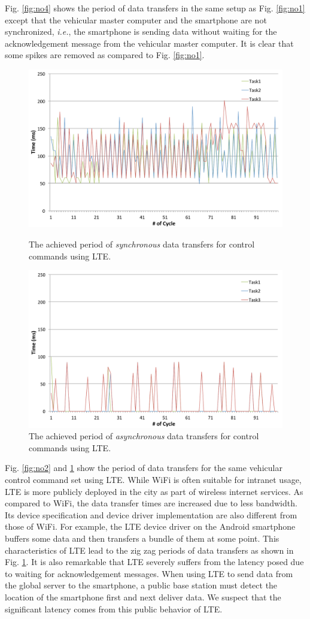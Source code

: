 Fig. \ref{fig:no4} shows the period of data transfers in the same
setup as Fig. \ref{fig:no1} except that the vehicular master computer and
the smartphone are not synchronized, \textit{i.e.}, the smartphone is
sending data without waiting for the acknowledgement message from the
vehicular master computer.
It is clear that some spikes are removed as compared to
Fig. \ref{fig:no1}.

\begin{figure}[!t]
 \centering
 \includegraphics[width=0.8\hsize]{fig/No2_Andrive_serv_cycle_LTE.pdf}
 \caption{The achieved period of \textit{synchronous} data transfers for
 control commands using LTE.}
 \label{fig:no2}
 \vspace{1em}
 \includegraphics[width=0.8\hsize]{fig/No5_Andrive_serv_cycle_LTE_only_send.pdf}
 \caption{The achieved period of \textit{asynchronous} data transfers for
 control commands using LTE.}
 \label{fig:no5}
\end{figure}

Fig. \ref{fig:no2} and \ref{fig:no5} show the period of data transfers
for the same vehicular control command set using LTE.
While WiFi is often suitable for intranet usage, LTE is more publicly
deployed in the city as part of wireless internet services.
As compared to WiFi, the data transfer times are increased due to less
bandwidth.
Its device specification and device driver implementation are also
different from those of WiFi.
For example, the LTE device driver on the Android smartphone buffers
some data and then transfers a bundle of them at some point.
This characteristics of LTE lead to the zig zag periods of data
transfers as shown in Fig. \ref{fig:no5}.
It is also remarkable that LTE severely suffers from the latency posed
due to waiting for acknowledgement messages.
When using LTE to send data from the global server to the smartphone, a
public base station must detect the location of the smartphone first and
next deliver data.
We suspect that the significant latency comes from this public behavior
of LTE.

